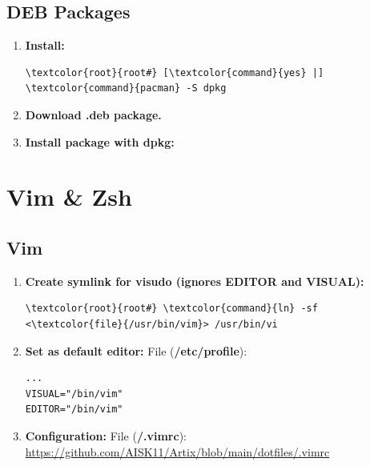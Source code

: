 \documentclass[10pt, a4paper, onecolumn, oneside, titlepage, openany]{book}
\begin{document}
\section{DEB Packages}
\begin{enumerate}
    \item \textbf{Install:}
\begin{Verbatim}[commandchars=\\\{\}]
\textcolor{root}{root#} [\textcolor{command}{yes} |] \textcolor{command}{pacman} -S dpkg
\end{Verbatim}  
    \item \textbf{Download .deb package.}
    \item \textbf{Install package with dpkg:}
\end{enumerate}


\chapter{Vim \& Zsh}
\section{Vim}
\begin{enumerate}
    \item \textbf{Create symlink for visudo (ignores EDITOR and VISUAL):}
\begin{Verbatim}[commandchars=\\\{\}]
\textcolor{root}{root#} \textcolor{command}{ln} -sf <\textcolor{file}{/usr/bin/vim}> /usr/bin/vi
\end{Verbatim}
    \item \textbf{Set as default editor:}
\newline File (\textbf{\textcolor{file}{/etc/profile}}):
\begin{Verbatim}[commandchars=\\\{\}]
...
VISUAL="/bin/vim"
EDITOR="/bin/vim"
\end{Verbatim}
    \item \textbf{Configuration:}
\newline File (\textbf{\textcolor{file}{\texttildelow/.vimrc}}):
\newline \url{https://github.com/AISK11/Artix/blob/main/dotfiles/.vimrc}
\end{enumerate}
\end{document}
